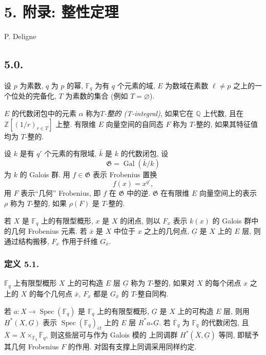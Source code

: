 \section*{5. 附录: 整性定理}

\begin{center}
P. Deligne
\end{center}

\subsection*{5.0.}
设 $p$ 为素数, $q$ 为 $p$ 的幂, $\mathbb F_q$ 为有 $q$ 个元素的域,
$E$ 为数域在素数 $\ell\ne p$ 之上的一个位处的完备化, $T$ 为素数的集合
(例如 $T=\varnothing$).

$E$ 的代数闭包中的元素 $\alpha$ 称为\emph{$T$-整的 (T-integral)},
如果它在 $\mathbb Q$ 上代数, 且在 $\mathbb Z[(1/r)_{r\in T}]$ 上整.
有限维 $E$ 向量空间的自同态 $F$ 称为 $T$-整的, 如果其特征值均为 $T$-整的.

设 $k$ 是有 $q'$ 个元素的有限域, $\bar k$ 是 $k$ 的代数闭包, 设
\[
\mathfrak G=\operatorname{Gal}(\bar k/k)
\]
为 $k$ 的 Galois 群. 用 $f\in\mathfrak G$ 表示 Frobenius 置换
\[
f(x)=x^{q'},
\]
用 $F$ 表示“几何” Frobenius, 即 $f$ 在 $\mathfrak G$ 中的逆.
$\mathfrak G$ 在有限维 $E$ 向量空间上的表示 $\rho$ 称为 $T$-整的,
如果 $\rho(F)$ 是 $T$-整的.

若 $X$ 是 $\mathbb F_q$ 上的有限型概形, $x$ 是 $X$ 的闭点,
则以 $F_x$ 表示 $k(x)$ 的 Galois 群中的几何 Frobenius 元素.
若 $\bar x$ 是 $X$ 中位于 $x$ 之上的几何点, $\underline G$ 是 $X$ 上的 $E$ 层,
则通过结构搬移, $F_x$ 作用于纤维 $G_{\bar x}$.

\subsubsection*{定义 5.1.}
$\mathbb F_q$ 上有限型概形 $X$ 上的可构造 $E$ 层 $\underline G$ 称为 $T$-整的,
如果对 $X$ 的每个闭点 $x$ 之上的 $X$ 的每个几何点 $\bar x$, $F_x$ 都是 $G_{\bar x}$ 的
$T$-整自同构.

若 $a:X\longrightarrow\operatorname{Spec}(\mathbb F_q)$ 是 $\mathbb F_q$ 上的有限型概形,
$\underline G$ 是 $X$ 上的可构造 $E$ 层, 则用 $\underline H^*(X,\underline G)$
表示 $\operatorname{Spec}(\mathbb F_q)_{\acute e t}$ 上的 $E$ 层 $R^*a_*\underline G$.
若 $\overline{\mathbb F}_q$ 为 $\mathbb F_q$ 的代数闭包, 且
$\overline X=X\times_{\mathbb F_q}\overline{\mathbb F}_q$, 则这些层可与作为 Galois 模的
上同调群 $H^*(\overline X,\underline G)$ 等同, 即赋予其几何 Frobenius $F$ 的作用.
对固有支撑上同调采用同样约定.

